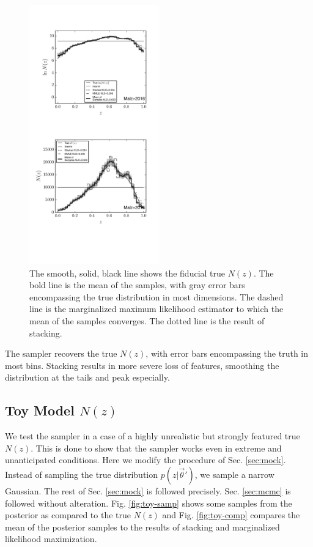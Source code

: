 \documentclass[preprint]{aastex}
\begin{document}
\begin{figure}
\includegraphics[width=0.5\textwidth]{figs/mult/comps.pdf}
\caption{The smooth, solid, black line shows the fiducial true $N(z)$.  The 
bold line is the mean of the samples, with gray error bars encompassing the 
true distribution in most dimensions.  The dashed line is the marginalized 
maximum likelihood estimator to which the mean of the samples converges.  The 
dotted line is the result of stacking.}
\label{fig:multi-comp}
\end{figure}

The sampler recovers the true $N(z)$, with error bars encompassing the truth in 
most bins.  Stacking results in more severe loss of features, smoothing the 
distribution at the tails and peak especially.  

\clearpage
\subsection{Toy Model $N(z)$}
\label{sec:fake}

We test the sampler in a case of a highly unrealistic but strongly featured 
true $N(z)$.  This is done to show that the sampler works even in extreme and 
unanticipated conditions.  Here we modify the procedure of Sec. \ref{sec:mock}. 
 Instead of sampling the true distribution $p(z|\vec{\theta}')$, we sample a 
narrow Gaussian.  The rest of Sec. \ref{sec:mock} is followed precisely.  Sec. 
\ref{sec:mcmc} is followed without alteration.  Fig. \ref{fig:toy-samp} shows 
some samples from the posterior as compared to the true $N(z)$ and Fig. 
\ref{fig:toy-comp} compares the mean of the posterior samples to the results of 
stacking and marginalized likelihood maximization.
\end{document}
